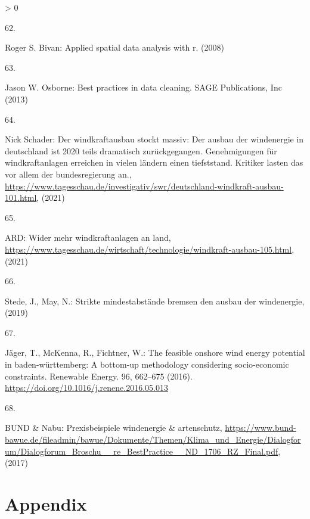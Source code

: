 \documentclass[a4paper,11pt]{article}
\newlength{\cslhangindent}
\newlength{\csllabelwidth}
\newenvironment{CSLReferences}[3] %
 {%
  \setlength{\parindent}{0pt}
  \ifodd #1 \everypar{\setlength{\hangindent}{\cslhangindent}}\ignorespaces\fi
  \ifnum #2 > 0
  \setlength{\parskip}{#2\baselineskip}
  \fi
 }%
 {}
\newcommand{\CSLLeftMargin}[1]{\parbox[t]{\maxof{\widthof{#1}}{\csllabelwidth}}{#1}}
\newcommand{\CSLRightInline}[1]{\parbox[t]{\linewidth}{#1}}
\begin{document}
\begin{CSLReferences}{0}{0}
\leavevmode\hypertarget{ref-RogerS.Bivan.2008}{}%
\CSLLeftMargin{62. }
\CSLRightInline{Roger S. Bivan: Applied spatial data analysis with r. (2008)}

\leavevmode\hypertarget{ref-JasonW.Osborne.2013}{}%
\CSLLeftMargin{63. }
\CSLRightInline{Jason W. Osborne: Best practices in data cleaning. {SAGE Publications, Inc} (2013)}

\leavevmode\hypertarget{ref-NickSchader.2021}{}%
\CSLLeftMargin{64. }
\CSLRightInline{Nick Schader: Der windkraftausbau stockt massiv: Der ausbau der windenergie in deutschland ist 2020 teils dramatisch zur{ü}ckgegangen. Genehmigungen f{ü}r windkraftanlagen erreichen in vielen l{ä}ndern einen tiefststand. Kritiker lasten das vor allem der bundesregierung an., \url{https://www.tagesschau.de/investigativ/swr/deutschland-windkraft-ausbau-101.html}, (2021)}

\leavevmode\hypertarget{ref-ARD.2021}{}%
\CSLLeftMargin{65. }
\CSLRightInline{ARD: Wider mehr windkraftanlagen an land, \url{https://www.tagesschau.de/wirtschaft/technologie/windkraft-ausbau-105.html}, (2021)}

\leavevmode\hypertarget{ref-Stede.2019}{}%
\CSLLeftMargin{66. }
\CSLRightInline{Stede, J., May, N.: Strikte mindestabst{ä}nde bremsen den ausbau der windenergie, (2019)}

\leavevmode\hypertarget{ref-Jager.2016}{}%
\CSLLeftMargin{67. }
\CSLRightInline{Jäger, T., McKenna, R., Fichtner, W.: The feasible onshore wind energy potential in baden-w{ü}rttemberg: A bottom-up methodology considering socio-economic constraints. Renewable Energy. 96, 662--675 (2016). \url{https://doi.org/10.1016/j.renene.2016.05.013}}

\leavevmode\hypertarget{ref-BUNDux5cux26Nabu.2017}{}%
\CSLLeftMargin{68. }
\CSLRightInline{BUND \& Nabu: Prexisbeispiele windenergie {\&} artenschutz, \url{https://www.bund-bawue.de/fileadmin/bawue/Dokumente/Themen/Klima_und_Energie/Dialogforum/Dialogforum_Broschu__re_BestPractice__ND_1706_RZ_Final.pdf}, (2017)}

\end{CSLReferences}
\indent
\setlength{\parindent}{17pt}
\setlength{\leftskip}{0pt}
\setlength{\parskip}{0pt}

\newpage

\appendix

\hypertarget{appendix}{%
\section{Appendix}\label{appendix}}
\end{document}

